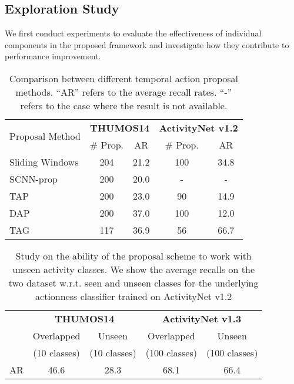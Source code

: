 \documentclass[10pt,twocolumn,letterpaper]{article}
\begin{document}
\subsection{Exploration Study}

We first conduct experiments to evaluate the effectiveness of individual components in the proposed framework and investigate how they contribute to 
performance improvement.



\begin{table}[h]
	\begin{center}
		\begin{tabular}{l|c|c|c|c}
			\hline 
			\multirow{2}{*}{Proposal Method}& \multicolumn{2}{|c|}{\textbf{THUMOS14}}  & \multicolumn{2}{|c}{\textbf{ActivityNet v1.2}} \\ 
			\cline{2-5}
			& \# Prop. & AR & \# Prop. & AR \\
			\hline 
			Sliding Windows&  204  & 21.2 & 100 & 34.8\\  
			\hline
			SCNN-prop~\cite{Shou2016SCNN} & 200 & 20.0 & - & - \\
			\hline
			TAP~\cite{caba2016cvpr}& 200  & 23.0  & 90  & 14.9 \\  
			\hline
			DAP~\cite{Escorcia2016DAP}& 200 & 37.0 &100 & 12.0  \\ 
			\hline\hline
			TAG & 117 & 36.9 & 56 & 66.7 \\ 
			\hline 
		\end{tabular} 
	\end{center}
	\caption{Comparison between different temporal action proposal methods. ``AR'' refers to the average recall rates. ``-'' refers to the case where the result is not available.}
	\label{table:proposals}
\end{table}

\begin{table}[h]
	\small
	\begin{center}
\begin{tabular}{c|c|c|c|c}
	\hline
	& \multicolumn{2}{c|}{\textbf{THUMOS14}} & \multicolumn{2}{c}{\textbf{ActivityNet v1.3}} \\ \cline{2-5}
	& Overlapped    & Unseen & Overlapped       & Unseen    \\
	& (10 classes)  & (10 classes)   & (100 classes)    & (100 classes)     \\ \hline
	AR & 46.6          & 28.3           & 68.1             & 66.4              \\ \hline
\end{tabular}
\end{center}
\caption{Study on the ability of the proposal scheme to work with unseen activity classes. We show the average recalls on the two dataset w.r.t. seen and unseen classes for the underlying actionness classifier trained on ActivityNet v1.2}
\label{table:actionness}
\end{table}
\end{document}
